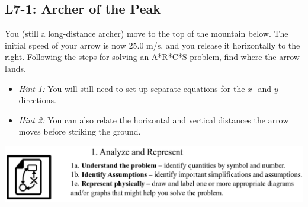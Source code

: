 \documentclass[]{article}
\begin{document}
\begin{PresentSpace}
	\vspace{-10pt}
	\section*{L7-1: Archer of the Peak}
	\vspace{-10pt}
	You (still a long-distance archer) move to the top of the mountain below. The initial speed of your arrow is now 25.0 m/s, and you release it horizontally to the right. Following the steps for solving an A*R*C*S problem, find where the arrow lands.
	\begin{itemize}
		\item \textit{Hint 1:} You will still need to set up separate equations for the $x$- and $y$-directions.
		\item \textit{Hint 2:} You can also relate the horizontal and vertical distances the arrow moves before striking the ground.
	\end{itemize}
	\begin{center}
	\end{center}
	\begin{center}
		\includegraphics[scale=0.4]{AnalyzeAndRepresent}
	\end{center}
\end{PresentSpace}
\newpage
\end{document}
